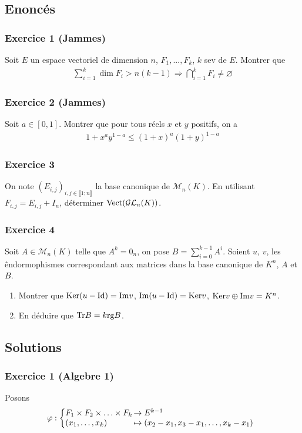 \documentclass{article}
\begin{document}
\subsection*{Enoncés}
\subsubsection*{Exercice 1 (Jammes)}
Soit $E$ un espace vectoriel de dimension $n$, $F_1,...,F_k$, $k$ sev de $E$. 
Montrer que 
\begin{align*}
\sum_{i=1}^{k}{\dim{F_i}}>n(k-1)\Rightarrow \bigcap_{i=1}^{k}{F_i}\neq \varnothing
\end{align*}
\subsubsection*{Exercice 2 (Jammes)}
Soit $a \in [0,1]$. Montrer que pour tous réels $x$ et $y$ positifs, on a 
\begin{align*}
1+x^ay^{1-a}\leq (1+x)^a (1+y)^{1-a}
\end{align*}
\subsubsection*{Exercice 3}
On note $(E_{i,j})_{i,j\in\llbracket 1;n\rrbracket}$ la base canonique de $\mathcal{M}_n(K)$. En utilisant $F_{i,j}=E_{i,j}+I_n$, déterminer $\textup{Vect}(\mathcal{G}\mathcal{L}_n(K))$.
\subsubsection*{Exercice 4}
Soit $A \in \mathcal{M}_n(K)$ telle que $A^k = 0_n$, on pose $B = \sum_{i=0}^{k-1}{A^i}$. Soient $u$, $v$, les êndormophismes correspondant aux matrices dans la base canonique de $K^n$, $A$ et $B$.
\begin{enumerate}
\item Montrer que $\textup{Ker}(u-\textup{Id}) = \textup{Im} v$, $\textup{Im}(u-\textup{Id}) = \textup{Ker} v$, $\textup{Ker} v\oplus \textup{Im} v = K^n$.
\item En déduire que $\textup{Tr} B = k \textup{rg} B$.
\end{enumerate}

\subsection*{Solutions}
\subsubsection*{Exercice 1 (Algebre 1)}
Posons 
\begin{align*}
  \varphi : \left\{
     \begin{array}{@{}l@{\thinspace}l}
      F_1\times F_2 \times \ldots \times F_k &\to E^{k-1}\\
      (x_1,\ldots, x_k) &\mapsto (x_2-x_1,x_3-x_1,\ldots, x_k-x_1)
     \end{array}
   \right.   
\end{align*}
\end{document}
